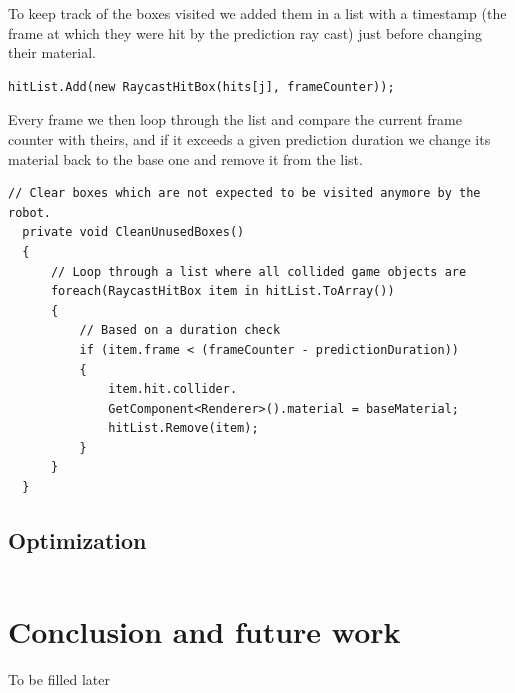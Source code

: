 \documentclass{scrartcl}
\begin{document}
To keep track of the boxes visited we added them in a list with a timestamp (the frame at which they were hit by the prediction ray cast) just before changing their material.

\begin{lstlisting}[language={[Sharp]C}]
  hitList.Add(new RaycastHitBox(hits[j], frameCounter));
\end{lstlisting}

Every frame we then loop through the list and compare the current frame counter with theirs, 
and if it exceeds a given prediction duration we change its material back to the base one and remove it from the list.

\begin{lstlisting}[language={[Sharp]C}]
  // Clear boxes which are not expected to be visited anymore by the robot.
  private void CleanUnusedBoxes()
  {
      // Loop through a list where all collided game objects are
      foreach(RaycastHitBox item in hitList.ToArray())
      {
          // Based on a duration check
          if (item.frame < (frameCounter - predictionDuration))
          {
              item.hit.collider.
              GetComponent<Renderer>().material = baseMaterial;
              hitList.Remove(item);
          }
      }
  }
\end{lstlisting}


\subsection{Optimization}
\begin{lstlisting}[language={[Sharp]C}]
\end{lstlisting}

\clearpage

\section{Conclusion and future work}
To be filled later


\end{document}
